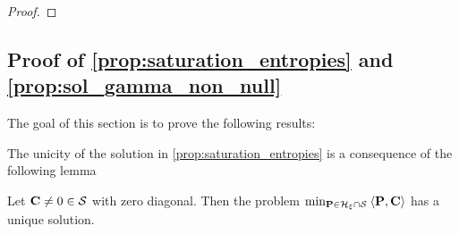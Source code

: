 \begin{proof}
\end{proof}

\subsection{Proof of \cref{prop:saturation_entropies} and \cref{prop:sol_gamma_non_null} \label{proof:main_props}}

The goal of this section is to prove the following results:

\saturation*

\solvingsea*

The unicity of the solution in \cref{prop:saturation_entropies} is a consequence of the following lemma

\begin{lemma} 
\label{lemma:unicity}
  Let $\mathbf{C} \neq 0 \in \mathcal{S}$ with zero diagonal. Then the problem $\min_{{\mathbf{P}} \in \mathcal{H}_{\xi} \cap \mathcal{S}} \: \langle {\mathbf{P}}, \mathbf{C} \rangle$ has a unique solution.
\end{lemma}

